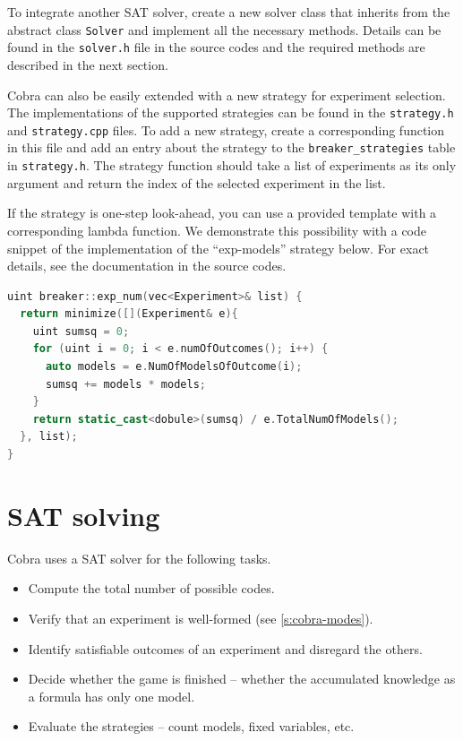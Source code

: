 To integrate another SAT solver,
  create a new solver class that inherits from
  the abstract class \texttt{Solver} and
  implement all the necessary methods.
Details can be found in the \texttt{solver.h} file in the source codes
  and the required methods
  are described in the next section.

Cobra can also be easily extended with a new strategy for experiment selection.
The implementations of the supported strategies can be found in
  the \texttt{strategy.h} and \texttt{strategy.cpp} files.
To add a new strategy, create a corresponding function in this file
  and add an entry about the strategy
  to the \texttt{breaker\_strategies} table in \texttt{strategy.h}.
The strategy function should take a list of experiments
  as its only argument
  and return the index of the selected experiment in the list.

If the strategy is one-step look-ahead,
  you can use a provided template with a corresponding lambda function.
We demonstrate this possibility with a code snippet of
  the implementation of the ``exp-models'' strategy below.
For exact details, see the documentation in the source codes.

\begin{lstlisting}[language=C++]
uint breaker::exp_num(vec<Experiment>& list) {
  return minimize([](Experiment& e){
    uint sumsq = 0;
    for (uint i = 0; i < e.numOfOutcomes(); i++) {
      auto models = e.NumOfModelsOfOutcome(i);
      sumsq += models * models;
    }
    return static_cast<dobule>(sumsq) / e.TotalNumOfModels();
  }, list);
}
\end{lstlisting}

\section{SAT solving} \label{s:cobra-sat}

Cobra uses a SAT solver for the following tasks.
\begin{itemize}
\item Compute the total number of possible codes.
\item Verify that an experiment is well-formed (see \autoref{s:cobra-modes}).
\item Identify satisfiable outcomes of an experiment and disregard the others.
\item Decide whether the game is finished -- whether the accumulated
  knowledge as a formula has only one model.
\item Evaluate the strategies -- count models, fixed variables, etc.
\end{itemize}

